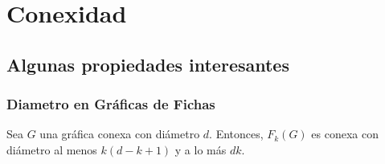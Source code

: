 \chapter{Conexidad}%
\label{cap:conexidad}

\section{Algunas propiedades interesantes}%
\label{sec:etiquetas}

\subsection{Diametro en Gr\'aficas de Fichas}%
\label{sec:diametro}

\begin{teorema}%
\label{teo:diamFG}
Sea $G$ una gr\'afica conexa con di\'ametro $d$. Entonces, $F_{k}(G)$ es 
conexa con di\'ametro al menos $k(d -k+1)$ y a lo m\'as $d k$.
\end{teorema}

